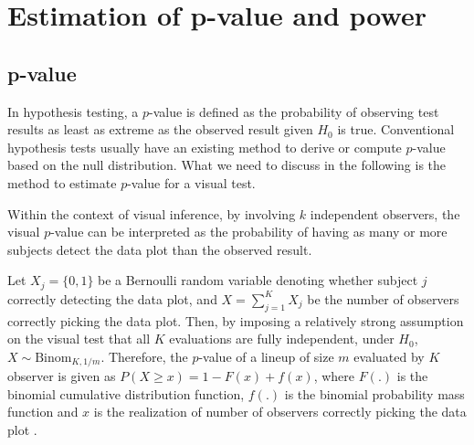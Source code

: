 \documentclass[]{interact}
\theoremstyle{plain}%
\theoremstyle{definition}
\theoremstyle{remark}
\begin{document}
\hypertarget{estimation-of-p-value-and-power}{%
\section{Estimation of p-value and
power}\label{estimation-of-p-value-and-power}}

\hypertarget{p-value}{%
\subsection{p-value}\label{p-value}}

In hypothesis testing, a \(p\)-value is defined as the probability of
observing test results as least as extreme as the observed result given
\(H_0\) is true. Conventional hypothesis tests usually have an existing
method to derive or compute \(p\)-value based on the null distribution.
What we need to discuss in the following is the method to estimate
\(p\)-value for a visual test.

Within the context of visual inference, by involving \(k\) independent
observers, the visual \(p\)-value can be interpreted as the probability
of having as many or more subjects detect the data plot than the
observed result.

Let \(X_j = \{0,1\}\) be a Bernoulli random variable denoting whether
subject \(j\) correctly detecting the data plot, and
\(X = \sum_{j=1}^{K}X_j\) be the number of observers correctly picking
the data plot. Then, by imposing a relatively strong assumption on the
visual test that all \(K\) evaluations are fully independent, under
\(H_0\), \(X \sim \mathrm{Binom}_{K,1/m}\). Therefore, the \(p\)-value
of a lineup of size \(m\) evaluated by \(K\) observer is given as
\(P(X \geq x) = 1 - F(x) + f(x)\), where \(F(.)\) is the binomial
cumulative distribution function, \(f(.)\) is the binomial probability
mass function and \(x\) is the realization of number of observers
correctly picking the data plot \citep{majumder_validation_2013}.
\end{document}
